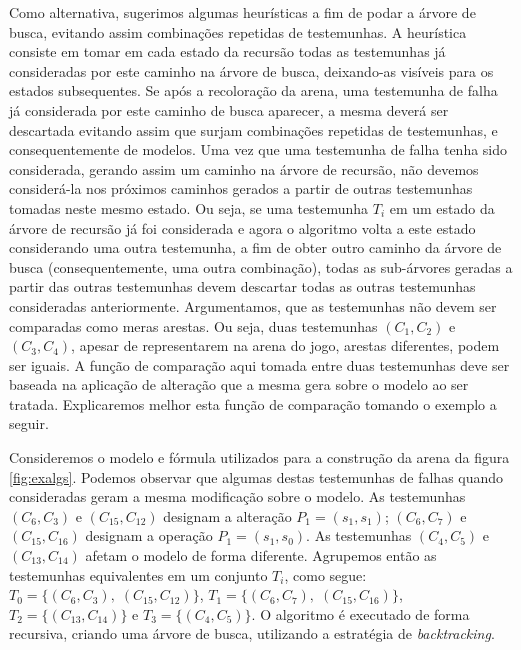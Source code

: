 \documentclass[normaltoc,capchap,capsec,times]{abnt}
\begin{document}
Como alternativa, sugerimos algumas heurísticas a fim de podar a árvore de busca, evitando assim combinações repetidas de testemunhas. A heurística consiste em tomar em cada estado da recursão todas as testemunhas já consideradas por este caminho na árvore de busca, deixando-as visíveis para os estados subsequentes. Se após a recoloração da arena, uma testemunha de falha já considerada por este caminho de busca aparecer, a mesma deverá ser descartada evitando assim que surjam combinações repetidas de testemunhas, e consequentemente de modelos. Uma vez que uma testemunha de falha tenha sido considerada, gerando assim um caminho na árvore de recursão, não devemos considerá-la nos próximos caminhos gerados a partir de outras testemunhas tomadas neste mesmo estado. Ou seja, se uma testemunha $T_i$ em um estado da árvore de recursão já foi considerada e agora o algoritmo volta a este estado considerando uma outra testemunha, a fim de obter outro caminho da árvore de busca (consequentemente, uma outra combinação), todas as sub-árvores geradas a partir das outras testemunhas devem descartar todas as outras testemunhas consideradas anteriormente. Argumentamos, que as testemunhas não devem ser comparadas como meras arestas. Ou seja, duas testemunhas $(C_1,C_2)$ e $(C_3,C_4)$, apesar de representarem na arena do jogo, arestas diferentes, podem ser iguais. A função de comparação aqui tomada entre duas testemunhas deve ser baseada na aplicação de alteração que a mesma gera sobre o modelo ao ser tratada. Explicaremos melhor esta função de comparação tomando o exemplo a seguir.

Consideremos o modelo e fórmula utilizados para a construção da arena da figura \ref{fig:exalgs}. Podemos observar que algumas destas testemunhas de falhas quando consideradas geram a mesma modificação sobre o modelo. As testemunhas $ (C_6,C_3)$ e $(C_{15},C_{12})$ designam  a alteração $P_1=(s_1,s_1)$;   $ (C_6,C_7)$ e $(C_{15},C_{16})$ designam a operação $P_1=(s_1,s_0)$. As testemunhas $(C_4,C_5)$ e $(C_{13},C_{14})$ afetam o modelo de forma diferente. Agrupemos então as testemunhas equivalentes em um conjunto $T_i$, como segue: $T_0 = \{ (C_6,C_3), \;(C_{15},C_{12}) \}$, $T_1 = \{ (C_6,C_7), \;(C_{15},C_{16}) \}$, $T_2 = \{ (C_{13},C_{14}) \}$ e $T_3= \{ (C_4,C_5)\}$. O algoritmo é executado de forma recursiva, criando uma árvore de busca, utilizando a estratégia de \textit{backtracking}.
\end{document}

